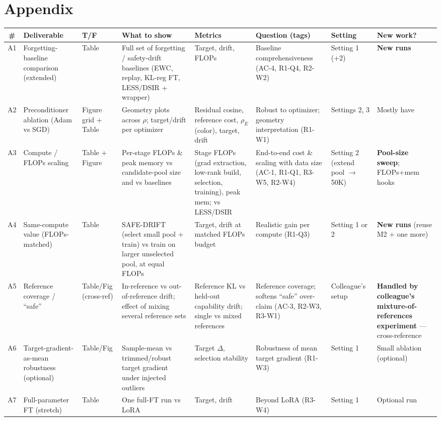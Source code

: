 \documentclass{article}
\begin{document}
\normalsize
\vspace{2em}
\section*{Appendix}

\footnotesize
\begin{tabular}{@{}cP{1.05in}P{0.45in}P{2.0in}P{1.5in}P{1.5in}P{0.7in}P{1.2in}@{}}
\toprule
\# & \textbf{Deliverable} & \textbf{T/F} & \textbf{What to show} & \textbf{Metrics} & \textbf{Question (tags)} & \textbf{Setting} & \textbf{New work?} \\
\midrule

A1 & Forgetting-baseline comparison (extended) & Table &
Full set of forgetting / safety-drift baselines (EWC, replay, KL-reg FT, LESS/DSIR + wrapper) &
Target, drift, FLOPs &
Baseline comprehensiveness (AC-4, R1-Q4, R2-W2) &
Setting 1 (+2) &
\textbf{New runs} \\

A2 & Preconditioner ablation (Adam vs SGD) & Figure grid + Table &
Geometry plots across $\rho$; target/drift per optimizer &
Residual cosine, reference cost, $\rho_E$ (color), target, drift &
Robust to optimizer; geometry interpretation (R1-W1) &
Settings 2, 3 &
Mostly have \\

A3 & Compute / FLOPs scaling & Table + Figure &
Per-stage FLOPs \& peak memory vs candidate-pool size and vs baselines &
Stage FLOPs (grad extraction, low-rank build, selection, training), peak mem; vs LESS/DSIR &
End-to-end cost \& scaling with data size (AC-1, R1-Q1, R3-W5, R2-W4) &
Setting 2 (extend pool $\to$ 50K) &
\textbf{Pool-size sweep}; FLOPs+mem hooks \\

A4 & Same-compute value (FLOPs-matched) & Table &
SAFE-DRIFT (select small pool + train) vs train on larger unselected pool, at equal FLOPs &
Target, drift at matched FLOPs budget &
Realistic gain per compute (R1-Q3) &
Setting 1 or 2 &
\textbf{New runs} (reuse M2 + one more) \\

A5 & Reference coverage / ``safe'' & Table/Fig (cross-ref) &
In-reference vs out-of-reference drift; effect of mixing several reference sets &
Reference KL vs held-out capability drift; single vs mixed references &
Reference coverage; softens ``safe'' over-claim (AC-3, R2-W3, R3-W1) &
Colleague's setup &
\textbf{Handled by colleague's mixture-of-references experiment} — cross-reference \\

A6 & Target-gradient-as-mean robustness (optional) & Table/Fig &
Sample-mean vs trimmed/robust target gradient under injected outliers &
Target $\Delta$, selection stability &
Robustness of mean target gradient (R1-W3) &
Setting 1 &
Small ablation (optional) \\

A7 & Full-parameter FT (stretch) & Table &
One full-FT run vs LoRA &
Target, drift &
Beyond LoRA (R3-W4) &
Setting 1 &
Optional run \\

\bottomrule
\end{tabular}
\end{document}
